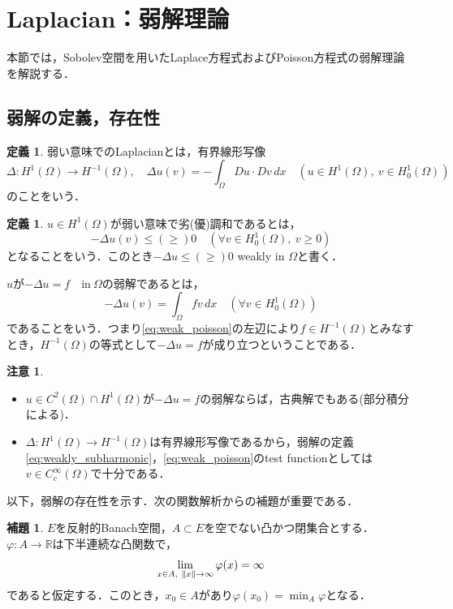 \documentclass[a4paper]{ltjsarticle}
\newcommand{\Rset}{\mathbb{R}}
\newcommand{\Om}{\Omega}
\newcommand{\inn}{\quad\text{in}\ }
\newcommand{\1}{\mathbbm{1}}
\numberwithin{equation}{section}
\theoremstyle{definition}
\newtheorem{dfn}[thm]{定義}
\newtheorem{lem}[thm]{補題}
\newtheorem{rmk}[thm]{注意}
\begin{document}
\section{Laplacian：弱解理論}
本節では，Sobolev空間を用いたLaplace方程式およびPoisson方程式の弱解理論を解説する．
\subsection{弱解の定義，存在性}
\begin{dfn}
    弱い意味でのLaplacianとは，有界線形写像
    \begin{equation}
        \Delta\colon H^1(\Om)\to H^{-1}(\Om),\quad \Delta u(v)=-\int_{\Om}Du\cdot Dv\,dx\quad (u\in H^1(\Om),\ v\in H^{1}_{0}(\Om))
    \end{equation}
    のことをいう．
\end{dfn}
\begin{dfn}
    $u\in H^1(\Om)$が弱い意味で劣(優)調和であるとは，
    \begin{equation}
        -\Delta u(v)\leq(\geq) 0\quad (\forall v\in H^1_0(\Om),\ v\geq0 )\label{eq:weakly_subharmonic}
    \end{equation}
    となることをいう．このとき$-\Delta u\leq(\geq)0$ weakly in $\Om$と書く．

    $u$が$-\Delta u=f\inn \Om$の弱解であるとは，
    \begin{equation}
        -\Delta u(v)=\int_{\Om}fv\,dx\quad (\forall v\in H^1_0(\Om)) \label{eq:weak_poisson}
    \end{equation}
    であることをいう．つまり\eqref{eq:weak_poisson}の左辺により$f\in H^{-1}(\Om)$とみなすとき，$H^{-1}(\Om)$の等式として$-\Delta u=f$が成り立つということである．
\end{dfn}
\begin{rmk}
    \begin{itemize}
        \item $u\in C^2(\Om)\cap H^1(\Om)$が$-\Delta u=f$の弱解ならば，古典解でもある(部分積分による)．
        \item $\Delta\colon H^1(\Om)\to H^{-1}(\Om)$は有界線形写像であるから，弱解の定義\eqref{eq:weakly_subharmonic}，\eqref{eq:weak_poisson}のtest functionとしては$v\in C^\infty_c(\Om)$で十分である．
    \end{itemize}
\end{rmk}
以下，弱解の存在性を示す．次の関数解析からの補題が重要である．
\begin{lem}
    $E$を反射的Banach空間，$A\subset E$を空でない凸かつ閉集合とする．$\varphi\colon A\to \Rset$は下半連続な凸関数で，
    \begin{equation}
        \lim_{x\in A,\ \norm{x}\to\infty}\varphi(x)=\infty 
    \end{equation}
    であると仮定する．このとき，$x_0\in A$があり$\varphi(x_0)=\min_{A}\varphi$となる．
\end{lem}
\end{document}
